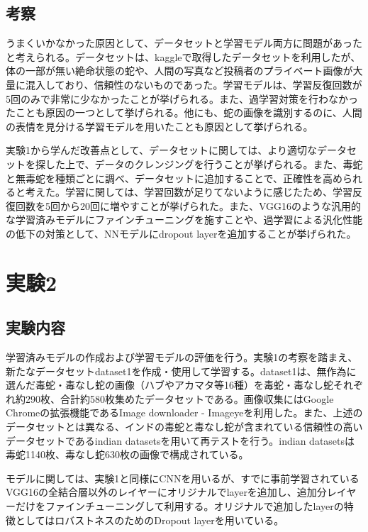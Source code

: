 \documentclass[a4paper, 11pt, titlepage]{jsarticle}
\begin{document}
\subsection{考察}
うまくいかなかった原因として、データセットと学習モデル両方に問題があったと考えられる。データセットは、kaggleで取得したデータセットを利用したが、体の一部が無い絶命状態の蛇や、人間の写真など投稿者のプライベート画像が大量に混入しており、信頼性のないものであった。学習モデルは、学習反復回数が5回のみで非常に少なかったことが挙げられる。また、過学習対策を行わなかったことも原因の一つとして挙げられる。他にも、蛇の画像を識別するのに、人間の表情を見分ける学習モデルを用いたことも原因として挙げられる。\par
実験1から学んだ改善点として、データセットに関しては、より適切なデータセットを探した上で、データのクレンジングを行うことが挙げられる。また、毒蛇と無毒蛇を種類ごとに調べ、データセットに追加することで、正確性を高められると考えた。学習に関しては、学習回数が足りてないように感じたため、学習反復回数を5回から20回に増やすことが挙げられた。また、VGG16のような汎用的な学習済みモデルにファインチューニングを施すことや、過学習による汎化性能の低下の対策として、NNモデルにdropout layerを追加することが挙げられた。\par

\section{実験2}
\subsection{実験内容}
学習済みモデルの作成および学習モデルの評価を行う。実験1の考察を踏まえ、新たなデータセットdataset1を作成・使用して学習する。dataset1は、無作為に選んだ毒蛇・毒なし蛇の画像（ハブやアカマタ等16種）を毒蛇・毒なし蛇それぞれ約290枚、合計約580枚集めたデータセットである。画像収集にはGoogle Chromeの拡張機能であるImage downloader - Imageye\cite{theme6}を利用した。また、上述のデータセットとは異なる、インドの毒蛇と毒なし蛇が含まれている信頼性の高いデータセットであるindian datasetsを用いて再テストを行う。indian datasetsは毒蛇1140枚、毒なし蛇630枚の画像で構成されている。\par
モデルに関しては、実験1と同様にCNNを用いるが、すでに事前学習されているVGG16の全結合層以外のレイヤーにオリジナルでlayerを追加し、追加分レイヤーだけをファインチューニングして利用する。オリジナルで追加したlayerの特徴としてはロバストネスのためのDropout layerを用いている。\par
\end{document}
